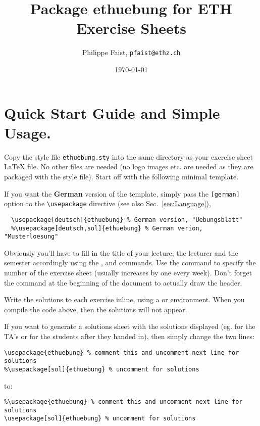 \documentclass[11pt,a4paper]{article}
\title{Package {\fontseries{m}\selectfont ethuebung} for ETH Exercise Sheets}
\author{Philippe Faist, \texttt{pfaist@ethz.ch}}
\date\today
\begin{document}
\maketitle

\inlinetoc

\section{Quick Start Guide and Simple Usage.}
\label{sec:quickstart}

Copy the style file \texttt{ethuebung.sty} into the same directory as your exercise sheet
\LaTeX{} file. No other files are needed (no logo images etc. are needed as they are
packaged with the style file). Start off with the following minimal template.

\begin{pkgverbatim}%
%
\end{pkgverbatim}

If you want the {\bfseries German} version of the template, simply pass the
\texttt{[german]} option to the \texttt{\textbackslash usepackage} directive (see also
Sec.~\ref{sec:Language}),
\begin{pkgverbatim}
\begin{verbatim}
  \usepackage[deutsch]{ethuebung} % German version, "Uebungsblatt"
  %\usepackage[deutsch,sol]{ethuebung} % German verion, "Musterloesung"
\end{verbatim}
\end{pkgverbatim}

Obviously you'll have to fill in the title of your lecture, the lecturer and the semester
accordingly using the ,  and
 commands. Use the  command to specify
the number of the exercise sheet (usually increases by one every week). Don't forget the
 command at the beginning of the document to actually draw the header.

Write the solutions to each exercise inline, using a  or 
environment. When you compile the code above, then the solutions will not appear.

If you want to generate a solutions sheet with the solutions displayed (eg. for the TA's
or for the students after they handed in), then simply change the two lines:
\begin{pkgverbatim}
\begin{verbatim}
\usepackage{ethuebung} % comment this and uncomment next line for solutions
%\usepackage[sol]{ethuebung} % uncomment for solutions
\end{verbatim}
\end{pkgverbatim}
to:
\begin{pkgverbatim}
\begin{verbatim}
%\usepackage{ethuebung} % comment this and uncomment next line for solutions
\usepackage[sol]{ethuebung} % uncomment for solutions
\end{verbatim}
\end{pkgverbatim}
\end{document}
